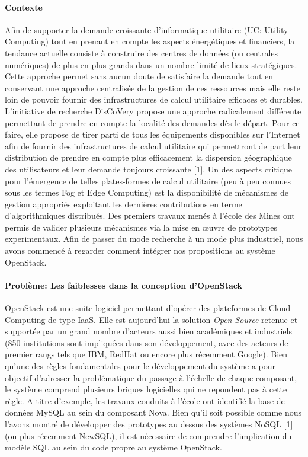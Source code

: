 \documentclass[a4paper,11pt]{article}
\newcommand{\discovery}{DisCoVery }
\begin{document}
\begin{note}
\paragraph*{Contexte\\}
Afin de supporter la demande croissante d'informatique utilitaire (UC:
Utility Computing) tout en prenant en compte les aspects énergétiques
et financiers, la tendance actuelle consiste à construire des centres
de données (ou centrales numériques) de plus en plus grands dans un
nombre limité de lieux stratégiques.  Cette approche permet sans aucun
doute de satisfaire la demande tout en conservant une approche
centralisée de la gestion de ces ressources mais elle reste loin de
pouvoir fournir des infrastructures de calcul utilitaire efficaces et
durables. L'initiative de recherche \discovery propose une approche
radicalement différente permettant de prendre en compte la localité
des demandes dès le départ. Pour ce faire, elle propose de tirer parti
de tous les équipements disponibles sur l'Internet afin de fournir des
infrastructures de calcul utilitaire qui permettront de part leur
distribution de prendre en compte plus efficacement la dispersion
géographique des utilisateurs et leur demande toujours croissante
[1]. Un des aspects critique pour l'émergence de telles plates-formes
de calcul utilitaire (peu à peu connues sous les termes Fog et Edge
Computing) est la disponibilité de mécanismes de gestion appropriés
exploitant les dernières contributions en terme d'algorithmiques
distribués.  Des premiers travaux menés à l'école des Mines ont permis
de valider plusieurs mécanismes via la mise en \oe uvre de prototypes
experimentaux. Afin de passer du mode recherche à un mode plus
industriel, nous avons commencé à regarder comment intégrer nos
propositions au système OpenStack.



\paragraph*{Problème: Les faiblesses dans la conception d'OpenStack\\}

OpenStack est une suite logiciel permettant d'opérer des plateformes
de Cloud Computing de type IaaS. Elle est aujourd'hui la solution
\emph{Open Source} retenue et supportée par un grand nombre d'acteurs aussi
bien académiques et industriels (850 institutions sont impliquées
dans son développement, avec des acteurs de premier rangs tels que IBM,
RedHat ou encore plus récemment Google).  Bien qu'une des règles
fondamentales pour le développement du système a pour objectif
d'adresser la problématique du passage à l'échelle de chaque
composant, le système comprend plusieurs briques logicielles qui ne
repondent pas à cette règle. A titre d'exemple, les travaux conduits à l'école ont identifié la base de
données MySQL au sein du composant Nova. Bien qu'il soit possible comme nous l'avons montré de développer des prototypes
au dessus des systèmes NoSQL [1] (ou plus récemment NewSQL), il est nécessaire de comprendre l'implication du modèle SQL au sein du code propre au système OpenStack.



\end{note}
\end{document}
